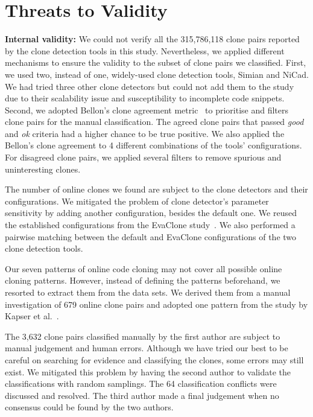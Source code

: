 \documentclass[sigconf,review, anonymous]{acmart}
\begin{document}
\section{Threats to Validity}

\textbf{Internal validity:} 
We could not verify all the 315,786,118 clone pairs reported by the clone detection tools in this study.
Nevertheless, we applied different mechanisms to ensure the validity to the subset of clone pairs we classified.
First, we used two, instead of one, widely-used clone detection tools, Simian and NiCad. 
We had tried three other clone detectors but could not add them to the study
due to their scalability issue and susceptibility to incomplete code snippets.
Second, we adopted Bellon's clone agreement metric~\cite{Bellon2007} to prioritise and filters clone pairs 
for the manual classification. The agreed clone pairs that passed \textit{good} and \textit{ok} criteria had a higher chance
to be true positive. We also applied the Bellon's clone agreement to 4 different combinations of the tools' configurations.
For disagreed clone pairs, we applied several filters to remove spurious and uninteresting clones. 

The number of online clones we found are subject to the clone detectors and their configurations. 
We mitigated the problem of clone detector's parameter sensitivity by adding another configuration, besides the default one. We reused the established configurations from the EvaClone study~\cite{Wang2013}.
We also performed a pairwise matching between the default and EvaClone configurations of the two clone detection tools.

Our seven patterns of online code cloning may not cover all possible online cloning patterns. However, instead of 
defining the patterns beforehand, we resorted to extract them from the data sets. We derived them
from a manual investigation of 679 online clone pairs and adopted one pattern from the study by Kapser et al.~\cite{Kapser2003}.

The 3,632 clone pairs classified manually by the first author are subject to manual judgement and human errors. 
Although we have tried our best to be careful on searching for evidence and classifying the clones, some errors
may still exist. We mitigated this problem by having the second author to validate the classifications with random samplings.
The 64 classification conflicts were discussed and resolved. 
The third author made a final judgement when no consensus could be found by the two authors.
\end{document}
